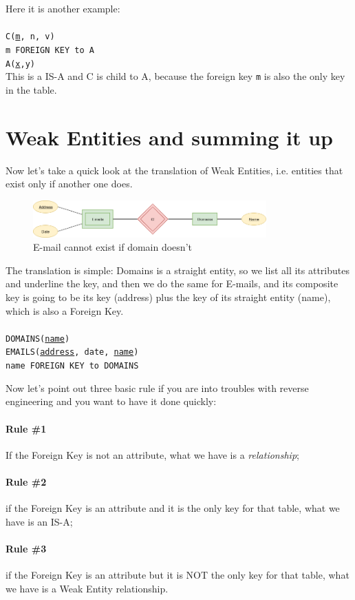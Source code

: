 \documentclass[class=book, crop=false, oneside]{standalone}
\newcommand\tab[1][1cm]{\hspace*{#1}}
\begin{document}
\vskip 5pt
Here it is another example:\\\\
\texttt{C(\underline{m}, n, v)}\\
\tab[.2cm] \texttt{m FOREIGN KEY to A}\\
\texttt{A(\underline{x},y)}\\
\vskip 5pt
This is a IS-A and C is child to A, because the foreign key \texttt{m} is also the only key in the table.

\section{Weak Entities and summing it up}
Now let's take a quick look at the translation of Weak Entities, i.e. entities that exist only if another one does.
\begin{figure}[H]
	\includegraphics[width=0.8\textwidth,keepaspectratio]{diagram4_00.png}
	\caption{E-mail cannot exist if domain doesn't}
	\label{diagram4_00}
\end{figure}
\vskip 5pt
The translation is simple: Domains is a straight entity, so we list all its attributes and underline the key, and then we do the same for E-mails, and its composite key is going to be its key (address) plus the key of its straight entity (name), which is also a Foreign Key.\\\\
\texttt{DOMAINS(\underline{name})}\\
\texttt{EMAILS(\underline{address}, date, \underline{name})}\\
\tab[.2cm] \texttt{name FOREIGN KEY to DOMAINS}
\vskip 5pt

Now let's point out three basic rule if you are into troubles with reverse engineering and you want to have it done quickly:
\paragraph{Rule \#1} If the Foreign Key is not an attribute, what we have is a \emph{relationship};
\paragraph{Rule \#2} if the Foreign Key is an attribute and it is the only key for that table, what we have is an IS-A;
\paragraph{Rule \#3} if the Foreign Key is an attribute but it is NOT the only key for that table, what we have is a Weak Entity relationship.
\end{document}
